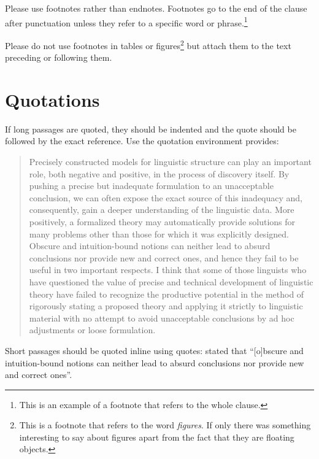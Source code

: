 Please use footnotes rather than endnotes. Footnotes go to the end of the clause after punctuation
unless they refer to a specific word or phrase.\footnote{
  This is an example of a footnote that refers to the whole clause.
}

Please do not use footnotes in tables or figures\footnote{
  This is a footnote that refers to the word \emph{figures}. If only there was something interesting
  to say about figures apart from the fact that they are floating objects.
} but attach them to the text preceding or following them.



\section{Quotations}

If long passages are quoted, they should be indented and the quote should be followed by the exact reference. Use the quotation environment \latex provides:
\begin{quotation}
Precisely constructed models for linguistic structure can play an
important role, both negative and positive, in the process of discovery 
itself. By pushing a precise but inadequate formulation to
an unacceptable conclusion, we can often expose the exact source
of this inadequacy and, consequently, gain a deeper understanding
of the linguistic data. More positively, a formalized theory may 
automatically provide solutions for many problems other than those
for which it was explicitly designed. Obscure and intuition-bound
notions can neither lead to absurd conclusions nor provide new and
correct ones, and hence they fail to be useful in two important respects. 
I think that some of those linguists who have questioned
the value of precise and technical development of linguistic theory
have failed to recognize the productive potential in the method
of rigorously stating a proposed theory and applying it strictly to
linguistic material with no attempt to avoid unacceptable conclusions 
by ad hoc adjustments or loose formulation.
\citep[5]{Chomsky57a}
\end{quotation}
%
Short passages should be quoted inline using quotes: \citet[5]{Chomsky57a} stated that ``[o]bscure
  and intuition-bound notions can neither lead to absurd conclusions nor provide new and
correct ones''.

